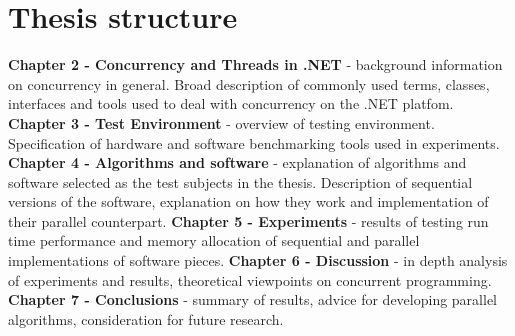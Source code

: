 \section{Thesis structure}
\textbf{Chapter 2 - Concurrency and Threads in .NET} -  background information on concurrency in general. 
Broad description of commonly used terms, classes, interfaces and tools used to deal with concurrency on the .NET platfom.
\newline
\textbf{Chapter 3 - Test Environment} - overview of testing environment. Specification of hardware and software benchmarking tools used in experiments.
\newline
\textbf{Chapter 4 - Algorithms and software} - explanation of algorithms and software selected as the test subjects in the thesis. Description of sequential versions of the software, explanation on how they work and implementation of their parallel counterpart. 
\newline
\textbf{Chapter 5 - Experiments} - results of testing run time performance and memory allocation of sequential and parallel implementations of software pieces.
\newline
\textbf{Chapter 6 - Discussion} - in depth analysis of experiments and results, theoretical viewpoints on concurrent programming.
\newline
\textbf{Chapter 7 - Conclusions} - summary of results, advice for developing parallel algorithms, consideration for future research.


